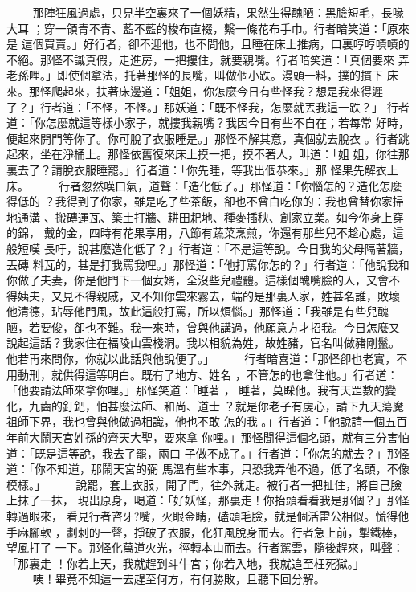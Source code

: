 \begin{pinyinscope}
{　　
那陣狂風過處，只見半空裏來了一個妖精，果然生得醜陋：黑臉短毛，長喙大耳
；穿一領青不青、藍不藍的梭布直裰，繫一條花布手巾。行者暗笑道：「原來是
這個買賣。」好行者，卻不迎他，也不問他，且睡在床上推病，口裏哼哼嘖嘖的
不絕。那怪不識真假，走進房，一把摟住，就要親嘴。行者暗笑道：「真個要來
弄老孫哩。」即使個拿法，托著那怪的長嘴，叫做個小跌。漫頭一料，撲的摜下
床來。那怪爬起來，扶著床邊道：「姐姐，你怎麼今日有些怪我？想是我來得遲
了？」行者道：「不怪，不怪。」那妖道：「既不怪我，怎麼就丟我這一跌？」
行者道：「你怎麼就這等樣小家子，就摟我親嘴？我因今日有些不自在；若每常
好時，便起來開門等你了。你可脫了衣服睡是。」那怪不解其意，真個就去脫衣
。行者跳起來，坐在淨桶上。那怪依舊復來床上摸一把，摸不著人，叫道：「姐
姐，你往那裏去了？請脫衣服睡罷。」行者道：「你先睡，等我出個恭來。」那
怪果先解衣上床。
　　
行者忽然嘆口氣，道聲：「造化低了。」那怪道：「你惱怎的？造化怎麼得低的
？我得到了你家，雖是吃了些茶飯，卻也不曾白吃你的：我也曾替你家掃地通溝
、搬磚運瓦、築土打牆、耕田耙地、種麥插秧、創家立業。如今你身上穿的錦，
戴的金，四時有花果享用，八節有蔬菜烹煎，你還有那些兒不趁心處，這般短嘆
長吁，說甚麼造化低了？」行者道：「不是這等說。今日我的父母隔著牆，丟磚
料瓦的，甚是打我罵我哩。」那怪道：「他打罵你怎的？」行者道：「他說我和
你做了夫妻，你是他門下一個女婿，全沒些兒禮體。這樣個醜嘴臉的人，又會不
得姨夫，又見不得親戚，又不知你雲來霧去，端的是那裏人家，姓甚名誰，敗壞
他清德，玷辱他門風，故此這般打罵，所以煩惱。」那怪道：「我雖是有些兒醜
陋，若要俊，卻也不難。我一來時，曾與他講過，他願意方才招我。今日怎麼又
說起這話？我家住在福陵山雲棧洞。我以相貌為姓，故姓豬，官名叫做豬剛鬣。
他若再來問你，你就以此話與他說便了。」
　　
行者暗喜道：「那怪卻也老實，不用動刑，就供得這等明白。既有了地方、姓名
，不管怎的也拿住他。」行者道：「他要請法師來拿你哩。」那怪笑道：「睡著
， 睡著，莫睬他。我有天罡數的變化，九齒的釘鈀，怕甚麼法師、和尚、道士
？就是你老子有虔心，請下九天蕩魔祖師下界，我也曾與他做過相識，他也不敢
怎的我 。」行者道：「他說請一個五百年前大鬧天宮姓孫的齊天大聖，要來拿
你哩。」那怪聞得這個名頭，就有三分害怕道：「既是這等說，我去了罷，兩口
子做不成了。」行者道：「你怎的就去？」那怪道：「你不知道，那鬧天宮的弼
馬溫有些本事，只恐我弄他不過，低了名頭，不像模樣。」
　　
說罷，套上衣服，開了門，往外就走。被行者一把扯住，將自己臉上抹了一抹，
現出原身，喝道：「好妖怪，那裏走！你抬頭看看我是那個？」那怪轉過眼來，
看見行者咨牙?嘴，火眼金睛，磕頭毛臉，就是個活雷公相似。慌得他手麻腳軟
，劃剌的一聲，掙破了衣服，化狂風脫身而去。行者急上前，掣鐵棒，望風打了
一下。那怪化萬道火光，徑轉本山而去。行者駕雲，隨後趕來，叫聲：「那裏走
！你若上天，我就趕到斗牛宮；你若入地，我就追至枉死獄。」
　　
    咦！畢竟不知這一去趕至何方，有何勝敗，且聽下回分解。





}
\end{pinyinscope}
